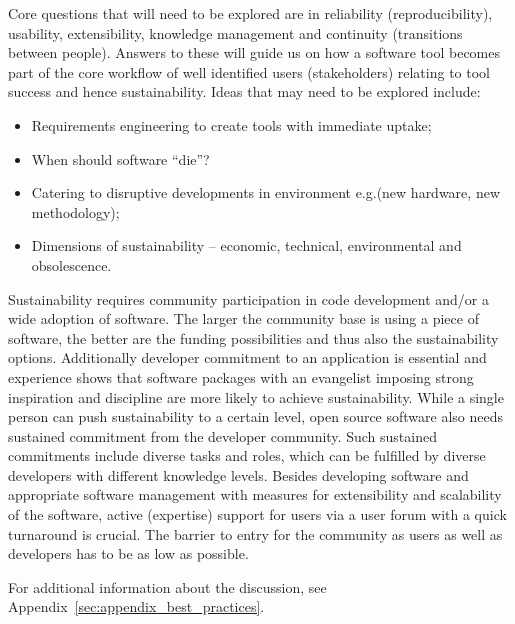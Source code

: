 Core questions that will need to be explored are in reliability (reproducibility), usability, extensibility, knowledge management and continuity (transitions between people). Answers to these will guide us on how a software tool becomes part of the core workflow of well identified users (stakeholders) relating to tool success and hence sustainability. 
Ideas  that may need to be explored include:
\begin{itemize}
\item Requirements engineering to create tools with immediate uptake;
\item When should software ``die''?
\item Catering to disruptive developments in environment e.g.(new hardware, new methodology);
\item Dimensions of sustainability -- economic, technical, environmental and
obsolescence. 
\end{itemize}

Sustainability requires community participation in code development and/or a wide adoption of software.
The larger the community base is using a piece of software, the better are the funding possibilities and thus also the sustainability options.
Additionally developer commitment to an application is essential and experience shows that software packages with an evangelist imposing strong inspiration and discipline are more likely to achieve sustainability.
While a single person can push sustainability to a certain level, open source software also needs sustained commitment from the developer community.
Such sustained commitments include diverse tasks and roles, which can be fulfilled by diverse developers with different knowledge levels.
Besides developing software and appropriate software management with measures for extensibility and scalability of the software, active (expertise) support for users via a user forum with a quick turnaround is crucial.
The barrier to entry for the community as users as well as developers has to be as low as possible.

For additional information about the discussion, see Appendix~\ref{sec:appendix_best_practices}.

